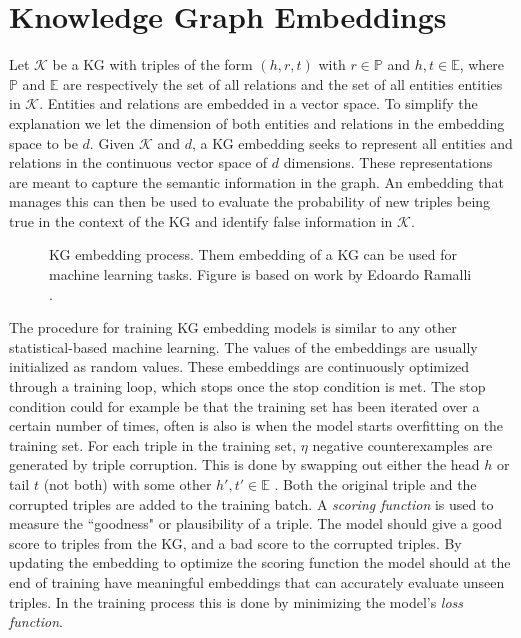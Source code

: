 \section{Knowledge Graph Embeddings}
\label{KG_embeddings}
Let $\mathcal{K}$ be a KG with triples of the form $(h, r, t)$ with $r\in \mathbb{P}$ and $h, t \in \mathbb{E}$, where $\mathbb{P}$ and $\mathbb{E}$ are respectively the set of all relations and the set of all entities entities in $\mathcal{K}$. Entities and relations are embedded in a vector space. To simplify the explanation we let the dimension of both entities and relations in the embedding space to be $d$.
Given $\mathcal{K}$ and $d$, a KG embedding seeks to represent all entities and relations in the continuous vector space of $d$ dimensions. These representations are meant to capture the semantic information in the graph. An embedding that manages this can then be used to evaluate the probability of new triples being true in the context of the KG and identify false information in $\mathcal{K}$.%

\begin{figure}[htp]
    \centering
    
    \caption[KG embedding process.]{KG embedding process. Them embedding of a KG can be used for machine learning tasks. Figure is based on work by Edoardo Ramalli \cite{wiki_KG_embedding}.}
    \label{KG_embdding_diag}
\end{figure}

The procedure for training KG embedding models is similar to any other statistical-based machine learning. The values of the embeddings are usually initialized as random values. These embeddings are continuously optimized through a training loop, which stops once the stop condition is met. The stop condition could for example be that the training set has been iterated over a certain number of times, often is also is when the model starts overfitting on the training set. For each triple in the training set, $\eta$ negative counterexamples are generated by triple corruption. This is done by swapping out either the head $h$ or tail $t$ (not both) with some other $h', t' \in \mathbb{E}$ \cite{TransE}. Both the original triple and the corrupted triples are added to the training batch. A \textit{scoring function} is used to measure the ``goodness" or plausibility of a triple. The model should give a good score to triples from the KG, and a bad score to the corrupted triples. By updating the embedding to optimize the scoring function the model should at the end of training have meaningful embeddings that can accurately evaluate unseen triples. In the training process this is done by minimizing the model's \textit{loss function}.


